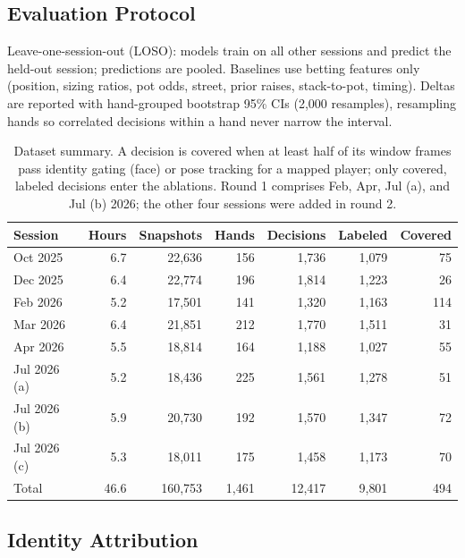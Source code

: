 \documentclass[conference]{IEEEtran}
\begin{document}
\subsection{Evaluation Protocol}
Leave-one-session-out (LOSO): models train on all
other sessions and predict the held-out session; predictions are pooled.
Baselines use betting features only (position, sizing ratios, pot odds,
street, prior raises, stack-to-pot, timing). Deltas are reported with
hand-grouped bootstrap 95\% CIs (2{,}000 resamples), resampling hands so
correlated decisions within a hand never narrow the interval.


\begin{table}[t]
\centering
\footnotesize
\setlength{\tabcolsep}{3.5pt}
\caption{Dataset summary. A decision is covered when at least half of its
window frames pass identity gating (face) or pose tracking for a mapped
player; only covered, labeled decisions enter the ablations. Round 1
comprises Feb, Apr, Jul (a), and Jul (b) 2026; the other four sessions
were added in round 2.}
\label{tab:data}
\begin{tabular}{lrrrrrr}
\toprule
Session & Hours & Snapshots & Hands & Decisions & Labeled & Covered \\
\midrule
Oct 2025     & 6.7 & 22{,}636 & 156 & 1{,}736 & 1{,}079 & 75 \\
Dec 2025     & 6.4 & 22{,}774 & 196 & 1{,}814 & 1{,}223 & 26 \\
Feb 2026     & 5.2 & 17{,}501 & 141 & 1{,}320 & 1{,}163 & 114 \\
Mar 2026     & 6.4 & 21{,}851 & 212 & 1{,}770 & 1{,}511 & 31 \\
Apr 2026     & 5.5 & 18{,}814 & 164 & 1{,}188 & 1{,}027 & 55 \\
Jul 2026 (a) & 5.2 & 18{,}436 & 225 & 1{,}561 & 1{,}278 & 51 \\
Jul 2026 (b) & 5.9 & 20{,}730 & 192 & 1{,}570 & 1{,}347 & 72 \\
Jul 2026 (c) & 5.3 & 18{,}011 & 175 & 1{,}458 & 1{,}173 & 70 \\
\midrule
Total        & 46.6 & 160{,}753 & 1{,}461 & 12{,}417 & 9{,}801 & 494 \\
\bottomrule
\end{tabular}
\end{table}

\subsection{Identity Attribution}
\label{sec:identity}
\end{document}
